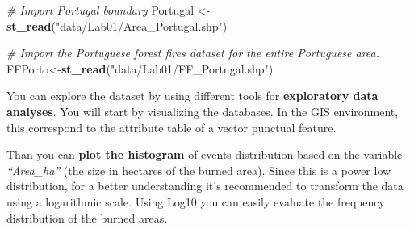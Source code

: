 \documentclass[
]{book}
\newenvironment{Shaded}{\begin{snugshade}}{\end{snugshade}}
\newcommand{\CommentTok}[1]{\textcolor[rgb]{0.56,0.35,0.01}{\textit{#1}}}
\newcommand{\FunctionTok}[1]{\textcolor[rgb]{0.13,0.29,0.53}{\textbf{#1}}}
\newcommand{\NormalTok}[1]{#1}
\newcommand{\OtherTok}[1]{\textcolor[rgb]{0.56,0.35,0.01}{#1}}
\newcommand{\SpecialCharTok}[1]{\textcolor[rgb]{0.81,0.36,0.00}{\textbf{#1}}}
\newcommand{\StringTok}[1]{\textcolor[rgb]{0.31,0.60,0.02}{#1}}
\begin{document}
\begin{Shaded}
\begin{Highlighting}[]
\CommentTok{\# Import Portugal boundary }
\NormalTok{Portugal }\OtherTok{\textless{}{-}} \FunctionTok{st\_read}\NormalTok{(}\StringTok{"data/Lab01/Area\_Portugal.shp"}\NormalTok{)}

\CommentTok{\# Import the Portuguese forest fires dataset for the entire Portuguese area.}
\NormalTok{FFPorto}\OtherTok{\textless{}{-}}\FunctionTok{st\_read}\NormalTok{(}\StringTok{"data/Lab01/FF\_Portugal.shp"}\NormalTok{)}
\end{Highlighting}
\end{Shaded}

You can explore the dataset by using different tools for \textbf{exploratory data analyses}.
You will start by visualizing the databases.
In the GIS environment, this correspond to the attribute table of a vector punctual feature.

Than you can \textbf{plot the histogram} of events distribution based on the variable \emph{``Area\_ha''} (the size in hectares of the burned area).
Since this is a power low distribution, for a better understanding it's recommended to transform the data using a logarithmic scale.
Using Log10 you can easily evaluate the frequency distribution of the burned areas.

\begin{Shaded}
\end{Shaded}

\begin{Shaded}
\end{Shaded}
\end{document}
